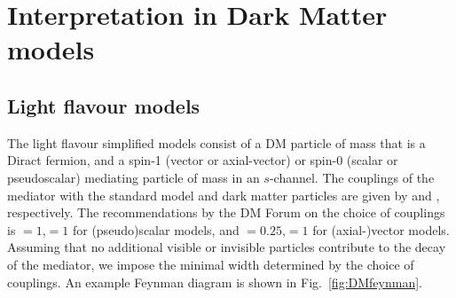 \section{Interpretation in Dark Matter models} \label{sec:darkmatter}


\subsection{Light flavour models} \label{sec:dm_lightjet}

The light flavour simplified models consist of a DM particle \pchi of mass
\mchi that is a Diract fermion, and a spin-1 (vector or axial-vector) or spin-0
(scalar or pseudoscalar) mediating particle \pphi of mass \mphi in an
$s$-channel. The couplings of the mediator with the standard model and dark
matter particles are given by \gsm and \gdm, respectively. The recommendations
by the DM Forum on the choice of couplings is \gsm$=1$,\gdm$=1$ for
(pseudo)scalar models, and \gsm$=0.25$,\gdm$=1$ for (axial-)vector models.
Assuming that no additional visible or invisible particles contribute to the decay 
of the mediator, we impose the minimal width determined by the choice of couplings. 
An example Feynman diagram is shown in Fig.~\ref{fig:DMfeynman}.



